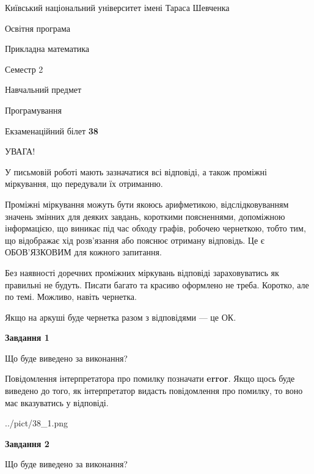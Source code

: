 \documentclass[12pt, ukrainian]{article}
\begin{document}
{{\begin {small}\par
{ \center  Київський національний університет імені Тараса Шевченка \par}
{\parbox {5 cm}{Освітня програма \hfill}{\parbox {7 cm}{Прикладна математика \hfill}}\parbox {6 cm}{\hfill Семестр 2}}\par
{\parbox {5 cm} {Навчальний предмет \hfill}\parbox {7 cm}{Програмування \hfill}\parbox {6cm}{\hfill}\par}\vspace{-7pt} \end{small}}{\center Екзаменаційний білет \No \textbf
{ 38 }\par}}
{
\begin {large}
УВАГА!

У письмовій роботі мають зазначатися всі відповіді, а також проміжні міркування, що передували їх отриманню.

Проміжні міркування можуть бути якоюсь арифметикою, відслідковуванням зна\-чень змінних для деяких завдань,
короткими поясненнями, допоміжною інформацією, що виникає під час обходу графів, робочею чернеткою,
тобто тим, що відображає хід розв’язання або пояснює отриману відповідь.
Це є ОБОВ’ЯЗКОВИМ для кожного запитання.

Без наявності доречних проміжних міркувань відповіді зараховуватись як правиль\-ні не будуть.
Писати багато та красиво оформлено не треба. Коротко, але по темі. Можли\-во, навіть чернетка.

Якщо на аркуші буде чернетка разом з відповідями --- це ОК.

\newpage

{\begin {center}\textbf{Завдання 1}\end {center}}\par
Що буде виведено за виконання?

Повідомлення інтерпретатора про помилку позначати \textbf{error}.
Якщо щось буде виведено до того, як інтерпретатор видасть повідомлення про помилку, 
то воно має вказуватись у відповіді. \par


\begin{center}
	{../pict/38_1.png}
\end{center}
\newpage

{\begin {center}\textbf{Завдання 2}\end {center}}\par
Що буде виведено за виконання?


\end{large}}
\end{document}
